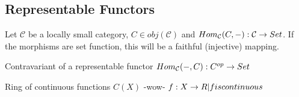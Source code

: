 \documentclass[../../notes.tex]{subfiles}
\begin{document}
\subsection{Representable Functors}

Let $\mathcal{C}$ be a locally small category, $ C \in obj(\mathcal{C}) $
and $ Hom_\mathcal{C} (C, -) : \mathcal{C} \rightarrow Set $. If the morphisms are set
function, this will be a faithful (injective) mapping.

Contravariant of a representable functor
$ Hom_\mathcal{C}(-, C) : C^{op} \rightarrow Set $

Ring of continuous functions $ C(X) $ -wow-
$ {f : X \rightarrow R | f is continuous } $
\end{document}
